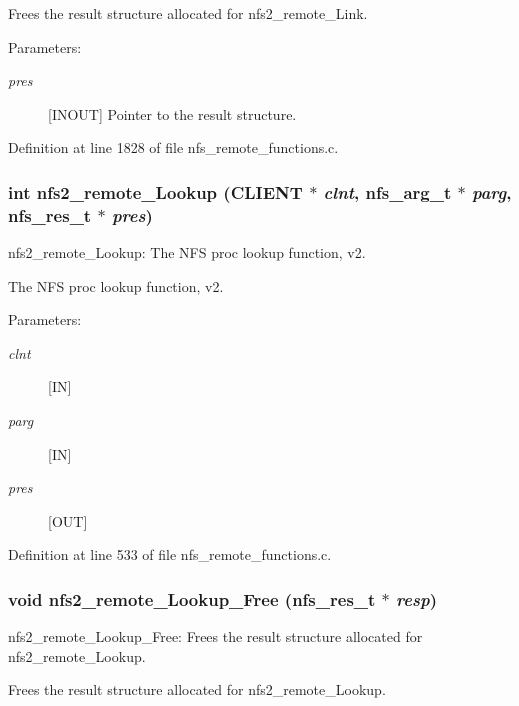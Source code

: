 Frees the result structure allocated for nfs2\_\-remote\_\-Link.

\begin{Desc}
\item[Parameters:]
\begin{description}
\item[{\em pres}][INOUT] Pointer to the result structure. \end{description}
\end{Desc}


Definition at line 1828 of file nfs\_\-remote\_\-functions.c.
\subsubsection{\setlength{\rightskip}{0pt plus 5cm}int nfs2\_\-remote\_\-Lookup (CLIENT $\ast$ {\em clnt}, nfs\_\-arg\_\-t $\ast$ {\em parg}, nfs\_\-res\_\-t $\ast$ {\em pres})}\label{group__NFSprocs_ga4}


nfs2\_\-remote\_\-Lookup: The NFS proc lookup function, v2.

The NFS proc lookup function, v2.

\begin{Desc}
\item[Parameters:]
\begin{description}
\item[{\em clnt}][IN] \item[{\em parg}][IN] \item[{\em pres}][OUT] \end{description}
\end{Desc}


Definition at line 533 of file nfs\_\-remote\_\-functions.c.
\subsubsection{\setlength{\rightskip}{0pt plus 5cm}void nfs2\_\-remote\_\-Lookup\_\-Free (nfs\_\-res\_\-t $\ast$ {\em resp})}\label{group__NFSprocs_ga57}


nfs2\_\-remote\_\-Lookup\_\-Free: Frees the result structure allocated for nfs2\_\-remote\_\-Lookup.

Frees the result structure allocated for nfs2\_\-remote\_\-Lookup.


